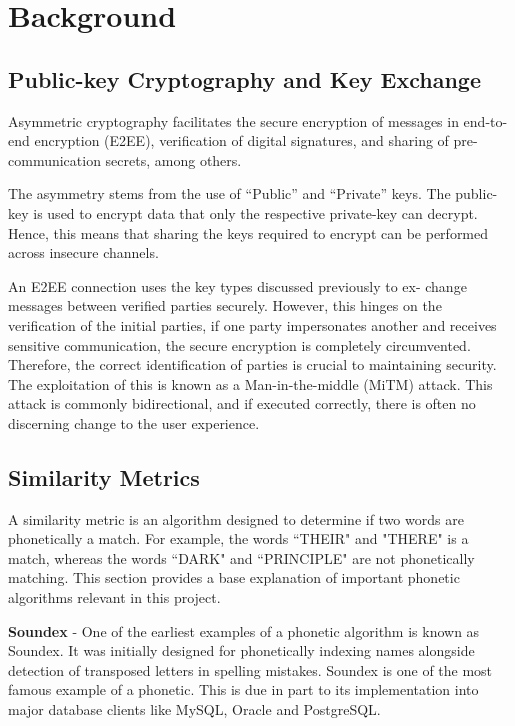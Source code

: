 \section{Background}

\subsection{Public-key Cryptography and Key Exchange}
Asymmetric cryptography facilitates the secure encryption of messages
in end-to-end encryption (E2EE), verification of digital signatures, and
sharing of pre-communication secrets, among others.

The asymmetry stems from the use of ``Public'' and ``Private'' keys. The
public-key is used to encrypt data that only the respective private-key
can decrypt. Hence, this means that sharing the keys required to encrypt
can be performed across insecure channels.

An E2EE connection uses the key types discussed previously to ex-
change messages between verified parties securely. However, this hinges
on the verification of the initial parties, if one party impersonates another and receives sensitive communication, the secure encryption is
completely circumvented. Therefore, the correct identification of parties is crucial to maintaining security. The exploitation of this is known as a Man-in-the-middle (MiTM) attack. This attack is commonly bidirectional, and if executed correctly, there is often no discerning change to the user experience.

\subsection{Similarity Metrics}
\label{sec:similarity_metric}
A similarity metric is an algorithm designed to determine if two words are phonetically a match. For example, the words ``THEIR" and "THERE" is a match, whereas the words ``DARK" and ``PRINCIPLE" are not phonetically matching. This section provides a base explanation of important phonetic algorithms relevant in this project.

\textbf{Soundex} - One of the earliest examples of a phonetic algorithm is known as Soundex. It was initially designed for phonetically indexing names alongside detection of transposed letters in spelling mistakes.  Soundex is one of the most famous example of a phonetic. This is due in part to its implementation into major database clients like MySQL\cite{mysql_soundex}, Oracle\cite{moved_2005} and PostgreSQL\cite{postgresql}.

